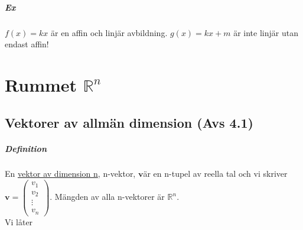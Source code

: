 \paragraph{Ex} $f(x)=kx$ är en affin och linjär avbildning. 
$g(x)=kx+m$ är inte linjär utan endast affin!

\chapter{Rummet  $\mathbb{R}^{n}$}
\section{Vektorer av allmän dimension (Avs 4.1)}
\paragraph{Definition} En \underline{vektor av dimension n}, n-vektor, $\bm{v}$är en n-tupel av reella tal och vi skriver
$\bm{v}=\begin{pmatrix}
    v_{1}\\
    v_{2}\\
    \vdots\\
    v_{n}
\end{pmatrix}$.
Mängden av alla n-vektorer är $\mathbb{R}^{n}$.\\
Vi låter 
